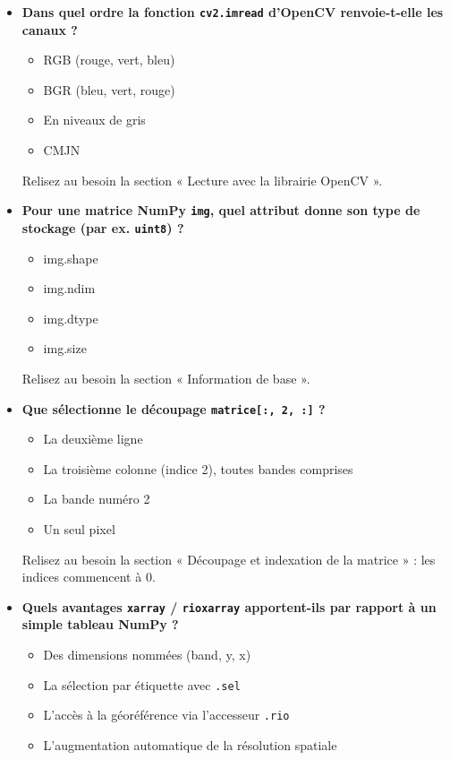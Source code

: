 \documentclass[
  french,
  11pt,
  letterpaper,
  open=any,
  twoside=false,
  french]{scrbook}
\providecommand{\tightlist}{%
  \setlength{\itemsep}{0pt}\setlength{\parskip}{0pt}}
\begin{document}
\begin{itemize}
  Relisez au besoin le tableau des types de données NumPy
  (tableau~\ref{tbl-numpytype}).
\item
  \textbf{Dans quel ordre la fonction \texttt{cv2.imread} d'OpenCV
  renvoie-t-elle les canaux ?}

  \begin{itemize}
  \tightlist
  \item
    RGB (rouge, vert, bleu)
  \item
    BGR (bleu, vert, rouge)
  \item
    En niveaux de gris
  \item
    CMJN
  \end{itemize}

  Relisez au besoin la section « Lecture avec la librairie OpenCV ».
\item
  \textbf{Pour une matrice NumPy \texttt{img}, quel attribut donne son
  type de stockage (par ex. \texttt{uint8}) ?}

  \begin{itemize}
  \tightlist
  \item
    img.shape
  \item
    img.ndim
  \item
    img.dtype
  \item
    img.size
  \end{itemize}

  Relisez au besoin la section « Information de base ».
\item
  \textbf{Que sélectionne le découpage \texttt{matrice{[}:,\ 2,\ :{]}}
  ?}

  \begin{itemize}
  \tightlist
  \item
    La deuxième ligne
  \item
    La troisième colonne (indice 2), toutes bandes comprises
  \item
    La bande numéro 2
  \item
    Un seul pixel
  \end{itemize}

  Relisez au besoin la section « Découpage et indexation de la matrice »
  : les indices commencent à 0.
\item
  \textbf{Quels avantages \texttt{xarray} / \texttt{rioxarray}
  apportent-ils par rapport à un simple tableau NumPy ?}

  \begin{itemize}
  \tightlist
  \item
    Des dimensions nommées (band, y, x)
  \item
    La sélection par étiquette avec \texttt{.sel}
  \item
    L'accès à la géoréférence via l'accesseur \texttt{.rio}
  \item
    L'augmentation automatique de la résolution spatiale
  \end{itemize}


\end{itemize}
\end{document}
